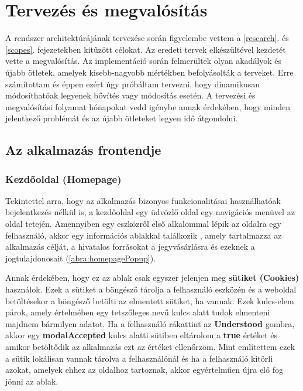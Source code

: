\chapter{Tervezés és megvalósítás}

A rendszer architektúrájának tervezése során figyelembe vettem a \ref{research}. és \ref{scopes}. fejezetekben kitűzött célokat. Az eredeti tervek elkészültével kezdetét vette a megvalósítás. Az implementáció során felmerültek olyan akadályok és újabb ötletek, amelyek kisebb-nagyobb mértékben befolyásolták a terveket. Erre számítottam és éppen ezért úgy próbáltam tervezni, hogy dinamikusan módosíthatóak legyenek bővítés vagy módosítás esetén. A tervezési és megvalósítási folyamat hónapokat vedd igénybe annak érdekében, hogy minden jelentkező problémát és az újabb ötleteket legyen idő átgondolni.

\section {Az alkalmazás frontendje}

\subsection {Kezdőoldal (Homepage)}

Tekintettel arra, hogy az alkalmazás bizonyos funkcionalitásai használhatóak bejelentkezés nélkül is, a kezdőoldal egy üdvözlő oldal egy navigációs menüvel az oldal tetején. Amennyiben egy eszközről első alkalommal lépik az oldalra egy felhasználó, akkor egy információs ablakkal találkozik \cite{Modal}, amely tartalmazza az alkalmazás célját, a hivatalos forrásokat a jegyvásárlásra és ezeknek a jogtulajdonosait (\ref{abra:homepagePopup}).

Annak érdekében, hogy ez az ablak csak egyszer jelenjen meg \textbf{sütiket (Cookies)} használok. Ezek a sütiket a böngésző tárolja a felhasználó eszközén és a weboldal betöltésekor a böngésző betölti az elmentett sütiket, ha vannak. Ezek kulcs-elem párok, amely értelmében egy tetszőleges nevű kulcs alatt tudok elmenteni majdnem bármilyen adatot. Ha a felhasználó rákattint az \textbf{Understood} gombra, akkor egy \textbf{modalAccepted} kulcs alatti sütiben eltárolom a \textbf{true} értéket és amikor betöltődik az alkalmazás ezt az értéket ellenőrzöm.
Mint említettem ezek a sütik lokálisan vannak tárolva a felhasználónál és ha a felhasználó kitörli azokat, amelyek ehhez az oldalhoz tartoznak, akkor egyértelműen újra elő fog jönni az ablak.

